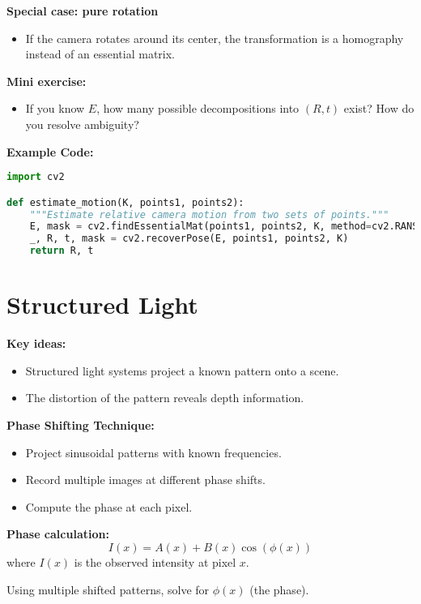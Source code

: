 \documentclass[a4paper,11pt]{article}
\begin{document}
\textbf{Special case: pure rotation}
\begin{itemize}
    \item If the camera rotates around its center, the transformation is a homography instead of an essential matrix.
\end{itemize}

\textbf{Mini exercise:}
\begin{itemize}
    \item If you know $E$, how many possible decompositions into $(R, t)$ exist? How do you resolve ambiguity?
\end{itemize}

\vspace{1em}

\textbf{Example Code:}
\begin{lstlisting}[language=Python]
import cv2

def estimate_motion(K, points1, points2):
    """Estimate relative camera motion from two sets of points."""
    E, mask = cv2.findEssentialMat(points1, points2, K, method=cv2.RANSAC, prob=0.999, threshold=1.0)
    _, R, t, mask = cv2.recoverPose(E, points1, points2, K)
    return R, t
\end{lstlisting}

\newpage
\section{Structured Light}

\textbf{Key ideas:}
\begin{itemize}
    \item Structured light systems project a known pattern onto a scene.
    \item The distortion of the pattern reveals depth information.
\end{itemize}

\textbf{Phase Shifting Technique:}
\begin{itemize}
    \item Project sinusoidal patterns with known frequencies.
    \item Record multiple images at different phase shifts.
    \item Compute the phase at each pixel.
\end{itemize}

\textbf{Phase calculation:}
\[
I(x) = A(x) + B(x) \cos(\phi(x))
\]
where $I(x)$ is the observed intensity at pixel $x$.

Using multiple shifted patterns, solve for $\phi(x)$ (the phase).
\end{document}
